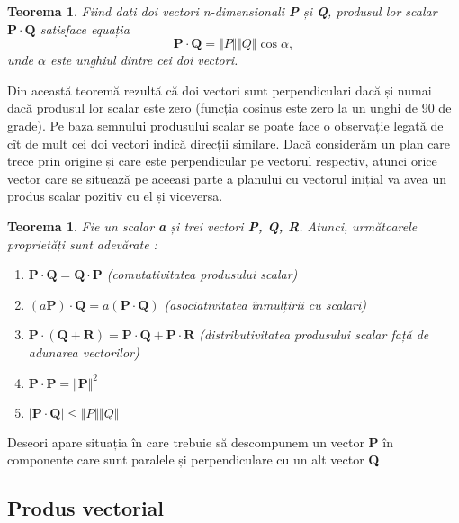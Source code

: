 \newtheorem{dotproduct_cosine}[vector_arith]{Teorema}
\begin{dotproduct_cosine}
Fiind dați doi vectori \textit{n}-dimensionali \textbf{P} și \textbf{Q},
produsul lor scalar $\mathbf{P \cdot Q}$ satisface equația
\begin{equation}
\label{eq:vec:11}
\mathbf{P \cdot Q} = \Vert P \Vert \Vert Q \Vert \cos \alpha,
\end{equation}
unde $\alpha$ este unghiul dintre cei doi vectori.
\end{dotproduct_cosine}
Din această teoremă rezultă că doi vectori sunt perpendiculari dacă și numai
dacă produsul lor scalar este zero (funcția cosinus este zero la un unghi de 90
de grade). Pe baza semnului produsului scalar se poate face o observație legată
de cît de mult cei doi vectori indică direcții similare. Dacă considerăm un plan
care trece prin origine și care este perpendicular pe vectorul respectiv, atunci
orice vector care se situează pe aceeași parte a planului cu vectorul inițial va
avea un produs scalar pozitiv cu el și viceversa.

\newtheorem{dotproduct_properties}[vector_arith]{Teorema}
\begin{dotproduct_properties}
Fie un scalar \textbf{a} și trei vectori \textbf{P, Q, R}. Atunci, următoarele
proprietăți sunt adevărate :
\begin{enumerate}
  \item $\mathbf{P \cdot Q} = \mathbf{Q \cdot P}$ (comutativitatea produsului
  scalar)
  \item $(\mathit{a}\mathbf{P}) \cdot \mathbf{Q} = \mathit{a}(\mathbf{P \cdot
  Q})$ (asociativitatea înmulțirii cu scalari)
  \item $\mathbf{P} \cdot (\mathbf{Q + R}) = \mathbf{P \cdot Q + P \cdot R} $
  (distributivitatea produsului scalar față de adunarea vectorilor)
  \item $\mathbf{P \cdot P} = \Vert \mathbf{P} \Vert ^ 2$
  \item $\mathbf{\vert P \cdot Q \vert} \leq \Vert P \Vert \Vert Q \Vert$
\end{enumerate}
\end{dotproduct_properties}

Deseori apare situația în care trebuie să descompunem un vector \textbf{P} în
componente care sunt paralele și perpendiculare cu un alt vector \textbf{Q}

\subsection{Produs vectorial}
\label{ch1:sec_vectors:cross_product}
\indent

